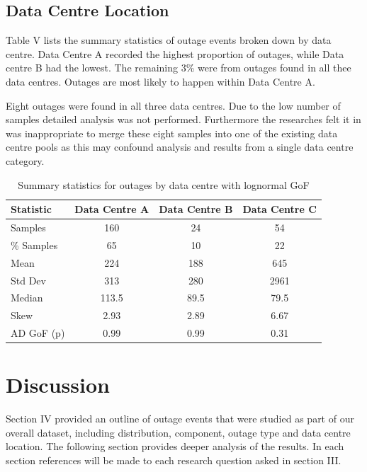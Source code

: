 \documentclass[conference]{IEEEtran}
\begin{document}
\subsection{Data Centre Location}

Table V lists the summary statistics of outage events broken down by data centre. Data Centre A recorded the highest proportion of outages, while Data centre B had the lowest. The remaining 3\% were from outages found in all thee data centres.  Outages are most likely to happen within Data Centre A.

Eight outages were found in all three data centres. Due to the low number of samples detailed analysis was not performed. Furthermore the researches felt it in was inappropriate to merge these eight samples into one of the existing data centre pools as this may confound analysis and results from a single data centre category. \par

\begin {table}
\caption {Summary statistics for outages by data centre with lognormal GoF} 
\begin{center}
\begin{tabular}{l | c | c | c} Statistic & Data Centre A & Data Centre B  & Data Centre C 
\\ \hline Samples & 160 & 24 & 54 
\\ \% Samples & 65 & 10 & 22
\\ Mean & 224	& 188 	& 645
\\ Std Dev & 313	& 280 & 2961
\\ Median & 113.5	& 89.5	& 79.5
\\ Skew & 2.93	& 2.89	& 6.67 
\\AD GoF (p) & 0.99 & 0.99 & 0.31 
\end{tabular}
\end{center}
\end{table}
\vspace{-2mm}

\section{Discussion}

Section IV provided an outline of outage events that were studied as part of our overall dataset, including distribution, component, outage type and data centre location. The following section provides deeper analysis of the results. In each section references will be made to each research question asked in section III.
\end{document}
